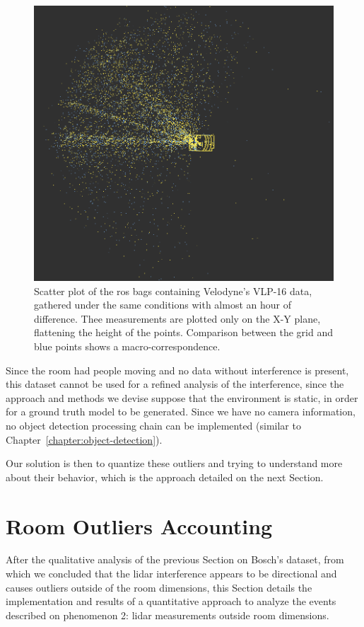 \begin{figure}[ht!]
	\centering
	\includegraphics[scale=0.33]{img/bosch/vlp16-tests-overlaid.png}
	\caption{Scatter plot of the \ac{ros} bags containing Velodyne's VLP-16 data, gathered under the same conditions with almost an hour of difference. Thee measurements are plotted only on the X-Y plane, flattening the height of the points. Comparison between the grid and blue points shows a macro-correspondence.}
	\label{fig:bosch-vlp16-comparison}
\end{figure}

Since the room had people moving and no data without interference is present, this dataset cannot be used for a refined analysis of the interference, since the approach and methods we devise suppose that the environment is static, in order for a ground truth model to be generated. Since we have no camera information, no object detection processing chain can be implemented (similar to Chapter~\ref{chapter:object-detection}). 

Our solution is then to quantize these outliers and trying to understand more about their behavior, which is the approach detailed on the next Section.


\section{Room Outliers Accounting}
After the qualitative analysis of the previous Section on Bosch's dataset, from which we concluded that the \ac{lidar} interference appears to be directional and causes outliers outside of the room dimensions, this Section details the implementation and results of a quantitative approach to analyze the events described on phenomenon 2: \ac{lidar} measurements outside room dimensions.

